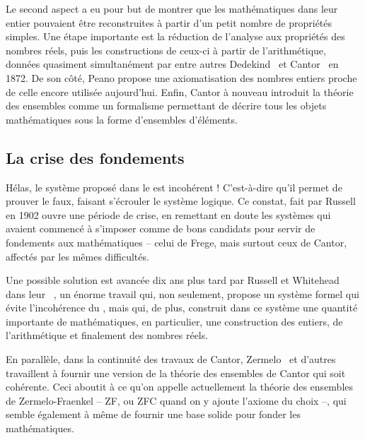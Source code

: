 Le second aspect a eu pour but de montrer que les mathématiques dans leur entier pouvaient
être reconstruites à partir d’un petit nombre de propriétés simples. Une étape
importante est la réduction de l’analyse aux propriétés
des nombres réels, puis les constructions de ceux-ci à partir
de l’arithmétique, données quasiment simultanément par entre autres
Dedekind~ et Cantor~ en 1872.
De son côté, Peano  propose
une axiomatisation des nombres entiers proche de celle encore utilisée aujourd’hui.
Enfin, Cantor à nouveau introduit la théorie des ensembles 
comme un formalisme permettant de décrire tous
les objets mathématiques sous la forme d’ensembles d’éléments.

\subsection{La crise des fondements}
Hélas, le système proposé dans le  est incohérent !
C’est-à-dire qu’il permet de prouver le faux, faisant s’écrouler le système logique.%
Ce constat, fait par Russell en 1902%
%
ouvre une période de crise, en remettant en doute les systèmes qui avaient commencé à
s’imposer comme de bons candidats pour servir de fondements aux mathématiques –
celui de Frege, mais surtout ceux de Cantor, affectés par les mêmes difficultés.

Une possible solution est avancée dix ans plus tard
par Russell et Whitehead dans leur ~,
un énorme travail qui, non seulement, propose un système
formel qui évite l’incohérence du
, mais qui, de plus, construit
dans ce système une quantité importante de mathématiques,
en particulier, une construction des entiers, de l’arithmétique et
finalement des nombres réels.

En parallèle, dans la continuité des travaux de Cantor,
Zermelo~ et
d’autres travaillent à fournir une version de la théorie des ensembles de Cantor
qui soit cohérente. Ceci aboutit à ce qu’on appelle actuellement la
théorie des ensembles de Zermelo-Fraenkel – ZF, ou ZFC quand on y ajoute l’axiome
du choix %
–, qui semble également à même de fournir une base solide pour fonder les
mathématiques.


